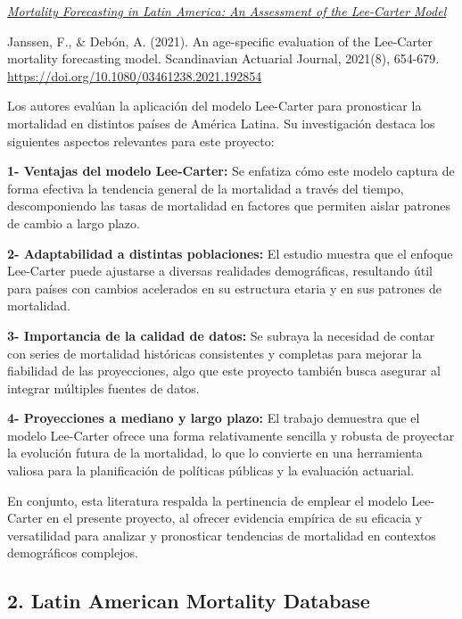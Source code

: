 \documentclass[
]{article}
\begin{document}
\href{https://www.tandfonline.com/doi/epdf/10.1080/03461238.2021.1928542?needAccess=true}{\emph{Mortality
Forecasting in Latin America: An Assessment of the Lee-Carter Model}}

Janssen, F., \& Debón, A. (2021). An age-specific evaluation of the
Lee-Carter mortality forecasting model. Scandinavian Actuarial Journal,
2021(8), 654-679. \url{https://doi.org/10.1080/03461238.2021.192854}

Los autores evalúan la aplicación del modelo Lee-Carter para pronosticar
la mortalidad en distintos países de América Latina. Su investigación
destaca los siguientes aspectos relevantes para este proyecto:

\textbf{1- Ventajas del modelo Lee-Carter:} Se enfatiza cómo este modelo
captura de forma efectiva la tendencia general de la mortalidad a través
del tiempo, descomponiendo las tasas de mortalidad en factores que
permiten aislar patrones de cambio a largo plazo.

\textbf{2- Adaptabilidad a distintas poblaciones:} El estudio muestra
que el enfoque Lee-Carter puede ajustarse a diversas realidades
demográficas, resultando útil para países con cambios acelerados en su
estructura etaria y en sus patrones de mortalidad.

\textbf{3- Importancia de la calidad de datos:} Se subraya la necesidad
de contar con series de mortalidad históricas consistentes y completas
para mejorar la fiabilidad de las proyecciones, algo que este proyecto
también busca asegurar al integrar múltiples fuentes de datos.

\textbf{4- Proyecciones a mediano y largo plazo:} El trabajo demuestra
que el modelo Lee-Carter ofrece una forma relativamente sencilla y
robusta de proyectar la evolución futura de la mortalidad, lo que lo
convierte en una herramienta valiosa para la planificación de políticas
públicas y la evaluación actuarial.

En conjunto, esta literatura respalda la pertinencia de emplear el
modelo Lee-Carter en el presente proyecto, al ofrecer evidencia empírica
de su eficacia y versatilidad para analizar y pronosticar tendencias de
mortalidad en contextos demográficos complejos.

\hypertarget{latin-american-mortality-database}{%
\subsection{2. Latin American Mortality
Database}\label{latin-american-mortality-database}}
\end{document}
